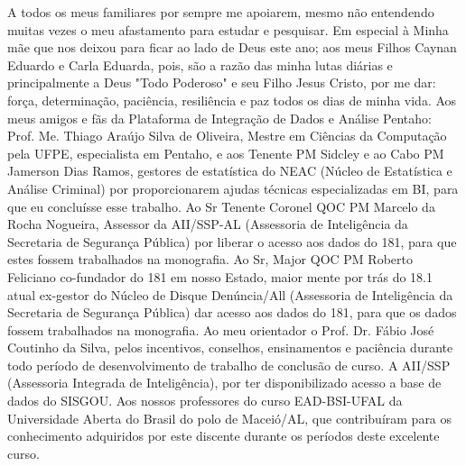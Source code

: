 %
%

\begin{agradecimento}

A todos os meus familiares por sempre me apoiarem, mesmo não entendendo muitas vezes o meu afastamento para estudar e pesquisar. Em especial à Minha mãe que nos deixou para ficar ao lado de Deus este ano; aos meus Filhos Caynan Eduardo e Carla Eduarda, pois, são a razão das minha lutas diárias e principalmente a Deus "Todo Poderoso" e seu Filho Jesus Cristo, por me dar: força, determinação, paciência, resiliência e paz todos os dias de minha vida.
Aos meus amigos e fãs da Plataforma de Integração de Dados e Análise Pentaho: Prof. Me. Thiago Araújo Silva de Oliveira, Mestre em Ciências da Computação pela UFPE, especialista em Pentaho, e aos Tenente PM Sidcley e ao Cabo PM Jamerson Dias Ramos, gestores de estatística do NEAC (Núcleo de Estatística e Análise Criminal) por proporcionarem ajudas técnicas especializadas em BI, para que eu concluísse esse trabalho.
Ao Sr Tenente Coronel QOC PM Marcelo da Rocha Nogueira, Assessor da AII/SSP-AL (Assessoria de Inteligência da Secretaria de Segurança Pública)  por liberar o acesso aos dados do 181, para que estes fossem trabalhados na monografia.
Ao Sr, Major QOC PM Roberto Feliciano co-fundador do 181 em nosso Estado, maior mente por trás do 18.1 atual ex-gestor do Núcleo de Disque Denúncia/All (Assessoria de Inteligência da Secretaria de Segurança Pública)  dar acesso aos dados do 181, para que os dados fossem trabalhados na monografia.
Ao meu orientador o Prof. Dr. Fábio José Coutinho da Silva, pelos incentivos, conselhos, ensinamentos e paciência durante todo período de desenvolvimento de trabalho de conclusão de curso.
A AII/SSP (Assessoria Integrada de Inteligência),  por ter disponibilizado acesso a base de dados do SISGOU.
Aos nossos professores do curso EAD-BSI-UFAL da Universidade Aberta do Brasil do polo de Maceió/AL, que contribuíram para os conhecimento adquiridos por este discente durante os períodos deste excelente curso.


\end{agradecimento}

